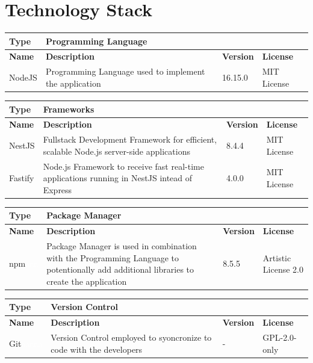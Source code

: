 \documentclass[12pt, a4paper]{article}
\begin{document}
\section{Technology Stack}
\begin{center}
\begin{tabular}{|p{1.5cm}|p{9cm}|p{1.5cm}|p{2cm}|}
\hline
\textbf{Type} & Programming Language & & \\
\hline
\textbf{Name} & \textbf{Description} & \textbf{Version} & \textbf{License}\\
\hline
NodeJS & Programming Language used to implement the application & 16.15.0 & MIT License\\
\hline
\end{tabular}\vspace{1cm}


\begin{tabular}{|p{1.5cm}|p{9cm}|p{1.5cm}|p{2cm}|}
\hline
\textbf{Type} & Frameworks & & \\
\hline
\textbf{Name} & \textbf{Description} & \textbf{Version} & \textbf{License}\\
\hline
NestJS & Fullstack Development Framework for efficient, scalable Node.js server-side applications & 8.4.4 & MIT License\\
\hline
Fastify & Node.js Framework to receive fast real-time applications running in NestJS intead of Express & 4.0.0 & MIT License\\
\hline
\end{tabular}\vspace{1cm}

\begin{tabular}{|p{1.5cm}|p{9cm}|p{1.5cm}|p{2cm}|}
    \hline
    \textbf{Type} & Package Manager & & \\
    \hline
    \textbf{Name} & \textbf{Description} & \textbf{Version} & \textbf{License}\\
    \hline
    npm\textcolor{white}{aaa} & Package Manager is used in combination with the Programming Language to potentionally add additional libraries to create the application & 8.5.5 & Artistic License 2.0\\
    \hline
\end{tabular}\vspace{1cm}

\begin{tabular}{|p{1.5cm}|p{9cm}|p{1.5cm}|p{2cm}|}
    \hline
    \textbf{Type} & Version Control & & \\
    \hline
    \textbf{Name} & \textbf{Description} & \textbf{Version} & \textbf{License}\\
    \hline
    Git\textcolor{white}{aaaaa} & Version Control employed to syoncronize to code with the developers  & - & GPL-2.0-only\\
    \hline
\end{tabular}
 

\end{center}
\end{document}

